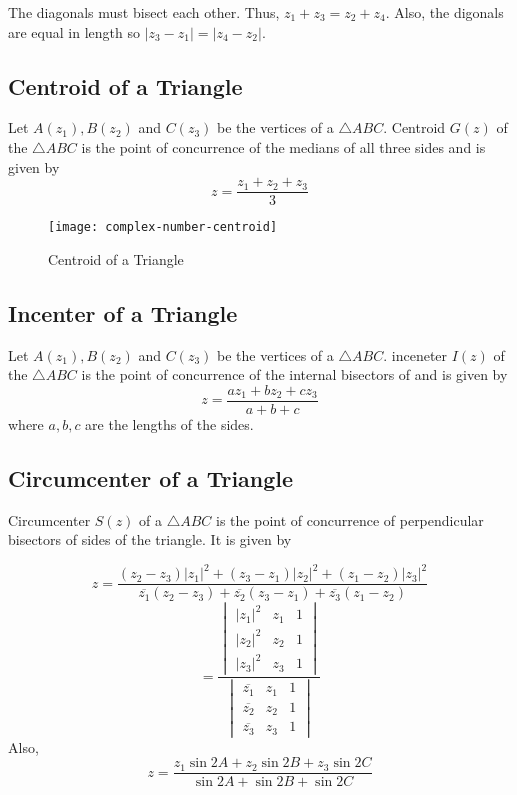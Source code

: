 The diagonals must bisect each other. Thus, $z_1 + z_3 = z_2 + z_4$. Also, the digonals are equal in length so $|z_3 - z_1| = |z_4
- z_2|$.

\subsection{Centroid of a Triangle}
Let $A(z_1), B(z_2)$ and $C(z_3)$ be the vertices of a $\triangle ABC.$ Centroid $G(z)$ of the $\triangle ABC$ is the point of
concurrence of the medians of all three sides and is given by
$$z = \frac{z_1 + z_2 + z_3}{3}$$
\begin{figure}[h]
  \begin{center}
    \texttt{[image: complex-number-centroid]}
    \caption{Centroid of a Triangle}
  \end{center}
\end{figure}

\subsection{Incenter of a Triangle}
Let $A(z_1), B(z_2)$ and $C(z_3)$ be the vertices of a $\triangle ABC.$ inceneter $I(z)$ of the $\triangle ABC$ is the point of
concurrence of the internal bisectors of and is given by
$$z = \frac{az_1 + bz_2 + cz_3}{a + b + c}$$
where $a, b, c$ are the lengths of the sides.

\subsection{Circumcenter of a Triangle}
Circumcenter $S(z)$ of a $\triangle ABC$ is the point of concurrence of perpendicular bisectors of sides of the triangle. It is
given by

$$z = \frac{(z_2 - z_3)|z_1|^2 + (z_3 - z_1)|z_2|^2 + (z_1 - z_2)|z_3|^2}{\overline{z_1}(z_2 - z_3) + \overline{z_2}(z_3 - z_1) + \overline{z_3}(z_1 - z_2)}$$
$$= \frac{\begin{vmatrix}|z_1|^2 & z_1 & 1\\ |z_2|^2 & z_2 & 1 \\ |z_3|^2 & z_3 & 1\end{vmatrix}}{\begin{vmatrix}\overline{z_1} & z_1 & 1\\\overline{z_2} & z_2 & 1\\\overline{z_3} & z_3 & 1 \end{vmatrix}}$$
Also,
$$z = \frac{z_1\sin2A + z_2\sin2B + z_3\sin2C}{\sin2A + \sin2B + \sin2C}$$

